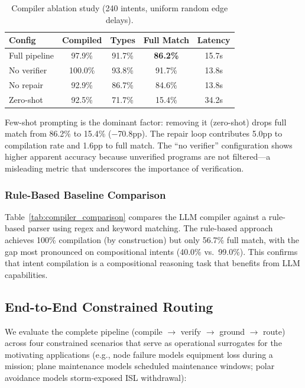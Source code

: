 \documentclass[10pt, conference, letterpaper]{IEEEtran}
\begin{document}
\begin{table}[t]
\centering
\caption{Compiler ablation study (240 intents, uniform random edge delays).}
\label{tab:ablation}
\begin{tabular}{lcccc}
\toprule
\textbf{Config} & \textbf{Compiled} & \textbf{Types} & \textbf{Full Match} & \textbf{Latency} \\
\midrule
Full pipeline  & 97.9\% & 91.7\% & \textbf{86.2\%} & 15.7s \\
No verifier    & 100.0\% & 93.8\% & 91.7\% & 13.8s \\
No repair      & 92.9\% & 86.7\% & 84.6\% & 13.8s \\
Zero-shot      & 92.5\% & 71.7\% & 15.4\% & 34.2s \\
\bottomrule
\end{tabular}
\end{table}

Few-shot prompting is the dominant factor: removing it (zero-shot)
drops full match from 86.2\% to 15.4\% ($-$70.8pp). The repair loop
contributes 5.0pp to compilation rate and 1.6pp to full match. The
``no verifier'' configuration shows higher apparent accuracy because
unverified programs are not filtered---a misleading metric that
underscores the importance of verification.



\subsubsection{Rule-Based Baseline Comparison}

Table~\ref{tab:compiler_comparison} compares the LLM compiler against
a rule-based parser using regex and keyword matching. The rule-based
approach achieves 100\% compilation (by construction) but only 56.7\%
full match, with the gap most pronounced on compositional intents
(40.0\% vs.\ 99.0\%). This confirms that intent compilation is a
compositional reasoning task that benefits from LLM capabilities.

\subsection{End-to-End Constrained Routing}
\label{sec:eval_e2e}

We evaluate the complete pipeline (compile $\to$ verify $\to$ ground
$\to$ route) across four constrained scenarios that serve as
operational surrogates for the motivating applications (e.g., node
failure models equipment loss during a mission; plane maintenance
models scheduled maintenance windows; polar avoidance models storm-exposed
ISL withdrawal):
\end{document}
